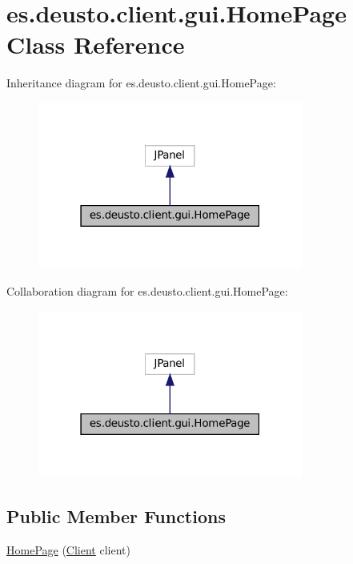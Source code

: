 \hypertarget{classes_1_1deusto_1_1client_1_1gui_1_1_home_page}{}\section{es.\+deusto.\+client.\+gui.\+Home\+Page Class Reference}
\label{classes_1_1deusto_1_1client_1_1gui_1_1_home_page}


Inheritance diagram for es.\+deusto.\+client.\+gui.\+Home\+Page\+:\nopagebreak
\begin{figure}[H]
\begin{center}
\leavevmode
\includegraphics[width=247pt]{classes_1_1deusto_1_1client_1_1gui_1_1_home_page__inherit__graph}
\end{center}
\end{figure}


Collaboration diagram for es.\+deusto.\+client.\+gui.\+Home\+Page\+:\nopagebreak
\begin{figure}[H]
\begin{center}
\leavevmode
\includegraphics[width=247pt]{classes_1_1deusto_1_1client_1_1gui_1_1_home_page__coll__graph}
\end{center}
\end{figure}
\subsection*{Public Member Functions}
\begin{DoxyCompactItemize}
\item 
\mbox{\hyperlink{classes_1_1deusto_1_1client_1_1gui_1_1_home_page_ada47f27769156f1d11578e12e651beed}{Home\+Page}} (\mbox{\hyperlink{classes_1_1deusto_1_1client_1_1_client}{Client}} client)
\end{DoxyCompactItemize}


